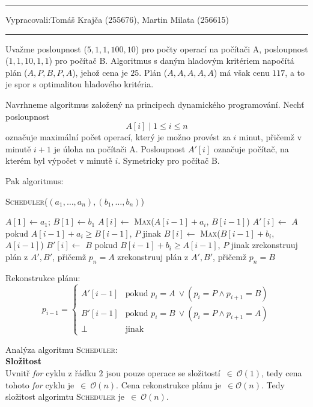 \documentclass[12pt]{article}
\newcommand{\la}{\leftarrow}
\newcommand{\zadani}[2]{
{\large
\noindent {\bf IB108 \hfill{} Sada #1, Příklad #2 \\[-4mm]}
\noindent\hrule
\vspace{2mm}
\noindent Vypracovali:\hfill{}Tomáš Krajča (255676), Martin Milata (256615)
\vspace{3mm}
\hrule
\bigskip\bigskip}
}
\begin{document}
\clearpage
\zadani{2}{4}

\noindent
Uvažme posloupnost ($5, 1, 1, 100, 10$) pro počty operací na počítači A, posloupnost
($1,1,10,1,1$) pro počítač B. Algoritmus s daným hladovým kritériem napočítá
plán ($A,P,B,P,A$), jehož cena je $25$. Plán ($A,A,A,A,A$) má však
cenu $117$, a to je spor s
optimalitou hladového kritéria.

\noindent
Navrhneme algoritmus založený na principech dynamického programování. 
Nechť posloupnost $$A[i] \mid 1\leq i \leq n$$ označuje maximální počet operací, který je
možno provést za $i$ minut, přičemž v minutě $i+1$ je úloha na počítači A.
Posloupnost $A'[i]$ označuje počítač, na kterém byl výpočet v minutě $i$.
Symetricky pro počítač B.

\noindent
Pak algoritmus:
\begin{algorithm}
\textsc{Scheduler}($(a_1,\dots,a_n),(b_1,\dots,b_n)$)
\begin{algorithmic}[1]
\STATE $A[1] \la a_1$; $B[1] \la b_1$
\FOR {$i \la 2~to~n$}
\STATE $A[i] \la$ \textsc{Max}($A[i-1]+a_i$, $B[i-1]$)
\STATE $A'[i] \la$ $A$ pokud $A[i-1]+a_i \geq B[i-1]$, $P$ jinak
\STATE $B[i] \la$ \textsc{Max}($B[i-1]+b_i$, $A[i-1]$)
\STATE $B'[i] \la$ $B$ pokud $B[i-1]+b_i \geq A[i-1]$, $P$ jinak
\ENDFOR
{}
\RETURN zrekonstruuj plán z $A',B'$, přičemž $p_n = A$
\ELSE
\RETURN zrekonstruuj plán z $A',B'$, přičemž $p_n = B$
\ENDIF
\end{algorithmic}
\end{algorithm}

\noindent
Rekonstrukce plánu:
\begin{equation*}
p_{i-1} = \left\{
	\begin{array}{cl}
	A'[i-1] & \text{pokud $p_{i} = A~\vee (p_i=P \wedge p_{i+1}=B)$}\\
	B'[i-1] & \text{pokud $p_{i} = B~\vee (p_i=P \wedge p_{i+1}=A)$}\\
	\bot & \text{jinak}
	\end{array} \right.
\end{equation*}


\bigskip
\noindent
Analýza algoritmu \textsc{Scheduler}:\\
\textbf{Složitost}\\
Uvnitř \textit{for} cyklu z řádku $2$ jsou pouze operace se složitostí~$\in~\mathcal{O}(1)$, tedy cena tohoto \textit{for} cyklu je~$\in~\mathcal{O}(n)$.
Cena rekonstrukce plánu je~$\in
\mathcal{O}(n)$. Tedy složitost algorimtu \textsc{Scheduler} je~$\in~\mathcal{O}(n)$.
\end{document}
